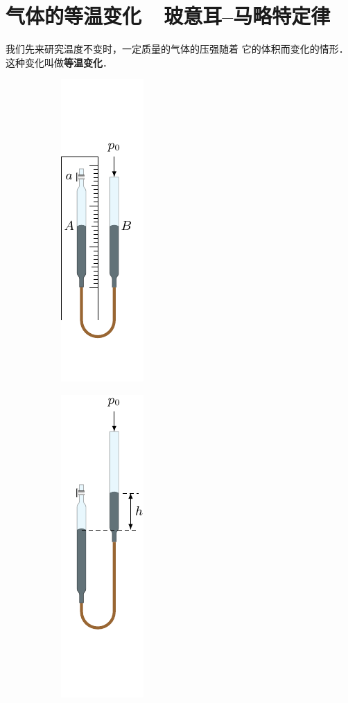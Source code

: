 \section{气体的等温变化~~玻意耳--马略特定律}
我们先来研究温度不变时，一定质量的气体的压强随着
它的体积而变化的情形．这种变化叫做\textbf{等温变化}．
\begin{figure}[htbp]
    \centering
    \begin{subfigure}{0.3\linewidth}
        \centering
        \includegraphics{fig/B/3-5a.pdf}
        \caption{}\label{fig_B_3-5a}
    \end{subfigure}
    \hfil
    \begin{subfigure}{0.3\linewidth}
        \centering
        \includegraphics{fig/B/3-5b.pdf}

\end{subfigure}
\end{figure}
